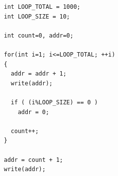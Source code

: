 \documentclass[12pt,twoside]{article}
\begin{document}
\begin{figure}[h!]
\centering

\begin{subfigure}[b]{0.3\textwidth}

\lstset{linewidth=7.5cm}	
\begin{lstlisting}
int LOOP_TOTAL = 1000;
int LOOP_SIZE = 10;

int count=0, addr=0;

for(int i=1; i<=LOOP_TOTAL; ++i)
{
  addr = addr + 1;
  write(addr);
  
  if ( (i%LOOP_SIZE) == 0 )
    addr = 0;
  
  count++;
}

addr = count + 1;
write(addr);
\end{lstlisting}
	\caption{}
	\label{codigo_valida}
\end{subfigure}
\qquad \qquad
\begin{subfigure}[b]{0.3\textwidth}

\end{subfigure}
\end{figure}
\end{document}
